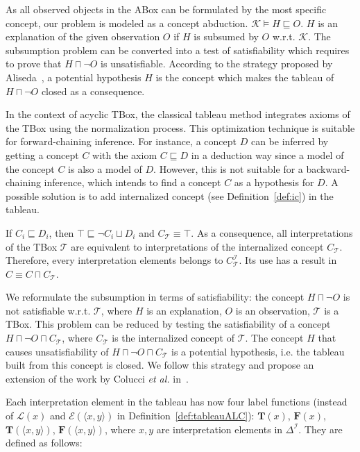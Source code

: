 \documentclass{article}
\begin{document}
As all observed objects in the ABox can be formulated by the most specific concept, our problem is modeled as a concept abduction.
$\mathcal{K}\vDash H\sqsubseteq O$.  $H$ is an explanation of the given observation $O$ if $H$ is subsumed by $O$ w.r.t.  $\mathcal{K}$. 
The subsumption problem can be converted into a test of satisfiability which requires to prove that $H\sqcap \neg O$ is unsatisfiable.
According to the strategy proposed by Aliseda~\cite{aliseda1997seeking}, a potential hypothesis $H$ is the concept which makes the tableau of  $H\sqcap \neg O$ closed as a consequence.

In the context of acyclic TBox, the classical tableau method integrates axioms of the TBox using the normalization process. This optimization technique is suitable for forward-chaining inference.
For instance, a concept $D$ can be inferred by getting a concept $C$ with the axiom $C\sqsubseteq D$ in a deduction way since a model of the concept $C$ is also a model of $D$.
However, this is not suitable for a backward-chaining inference, which intends to find a concept $C$ as a hypothesis for $D$. A possible solution is to add
internalized concept (see Definition~\ref{def:ic}) in the tableau.

If $C_i \sqsubseteq D_i$, then $\top \sqsubseteq \neg C_i  \sqcup D_i$ and  $C_\mathcal{T}\equiv \top$. 
As a consequence, all interpretations of the TBox $\mathcal{T}$ are equivalent to interpretations of the internalized concept $C_\mathcal{T}$.
Therefore, every interpretation elements belongs to  $C_\mathcal{T}^\mathcal{I}$. 
Its use has a result in $C\equiv C\sqcap C_\mathcal{T}$.


We reformulate the subsumption in terms of satisfiability: the concept $H \sqcap \neg O$ is not satisfiable w.r.t. $\mathcal{T}$, where $H$ is an explanation, $O$ is an observation,
$\mathcal{T}$ is a TBox. This problem can be reduced by testing the satisfiability of a concept $ H\sqcap \neg O \sqcap C_\mathcal{T}$, where $ C_\mathcal{T}$ is the internalized concept of $\mathcal{T}$.
The concept $H$ that causes unsatisfiability of $H\sqcap\neg O\sqcap C_\mathcal{T}$ is a potential hypothesis, i.e. the tableau built from this concept is closed.
We follow this strategy and propose an extension of the work by Colucci \textit{et al.} in~\cite{colucci2004uniform}.

Each interpretation element in the tableau has now four label functions (instead of $\mathcal{L}(x)$ and $\mathcal{E}(\langle x,y \rangle)$ in Definition~\ref{def:tableauALC}):
$\mathbf{T}(x)$, $\mathbf{F}(x)$, $\mathbf{T}(\langle x,y \rangle)$, $\mathbf{F}(\langle x,y \rangle)$,
where  $x,y$ are interpretation elements in $\Delta^\mathcal{I}$.
They are defined as follows:
\end{document}
